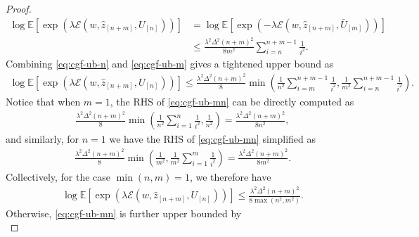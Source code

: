 \documentclass[onecolumn,romanappendices,10pt]{IEEEtran}
\newcommand{\Ecal}{{\mathcal E}}
\newcommand{\EE}{{\mathbb{E}}}
\begin{document}
\begin{proof}
\begin{equation}
\begin{aligned}
				\log \EE \left[ \exp \left( \lambda \Ecal\left( w, \hat{z}_{[n+m]}, U_{[n]} \right) \right) \right] &= \log \EE \left[ \exp \left( - \lambda \Ecal\left( w, \hat{z}_{[n+m]}, \bar{U}_{[m]} \right) \right) \right] \\
				&\leq \frac{\lambda^2 \Delta^2 (n+m)^2}{8 m^2} \sum_{i=n}^{n+m-1} \frac{1}{i^2}. 
			\end{aligned}\label{eq:cgf-ub-m}
		\end{equation}
		Combining \eqref{eq:cgf-ub-n} and \eqref{eq:cgf-ub-m} gives a tightened upper bound as
		\begin{equation}	
			\begin{aligned}
				\log \EE \left[ \exp \left( \lambda \Ecal\left( w, \hat{z}_{[n+m]}, U_{[n]} \right) \right) \right]
				\leq \frac{\lambda^2 \Delta^2 (n+m)^2}{8} \min \left( \frac{1}{n^2} \sum_{i=m}^{n+m-1} \frac{1}{i^2}, \frac{1}{m^2} \sum_{i=n}^{n+m-1} \frac{1}{i^2} \right).
				\label{eq:cgf-ub-mn}
			\end{aligned}
		\end{equation}
		Notice that when $m = 1$, the RHS of \eqref{eq:cgf-ub-mn} can be directly computed as
		\begin{equation}	
			\begin{aligned}
				\frac{\lambda^2 \Delta^2 (n+m)^2}{8} \min \left( \frac{1}{n^2} \sum_{i=1}^{n} \frac{1}{i^2}, \frac{1}{n^2} \right) = \frac{\lambda^2 \Delta^2 (n+m)^2}{8 n^2},
			\end{aligned}
		\end{equation}
		and similarly, for $n = 1$ we have the RHS of \eqref{eq:cgf-ub-mn} simplified as
		\begin{equation}	
			\begin{aligned}
				\frac{\lambda^2 \Delta^2 (n+m)^2}{8} \min \left( \frac{1}{m^2}, \frac{1}{m^2} \sum_{i=1}^{m} \frac{1}{i^2} \right) = \frac{\lambda^2 \Delta^2 (n+m)^2}{8 m^2}.
			\end{aligned}
		\end{equation}
		Collectively, for the case $\min(n, m) = 1$, we therefore have
		\begin{equation}	
			\begin{aligned}
				\log \EE \left[ \exp \left( \lambda \Ecal\left( w, \hat{z}_{[n+m]}, U_{[n]} \right) \right) \right]
				\leq \frac{\lambda^2 \Delta^2 (n+m)^2}{8 \max(n^2, m^2)}.
			\end{aligned}\label{eq:cgf-ub-1}
		\end{equation}
		Otherwise, \eqref{eq:cgf-ub-mn} is further upper bounded by
		\begin{equation}	

\end{equation}
\end{proof}
\end{document}
